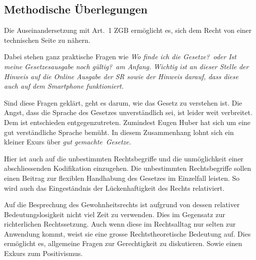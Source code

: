 \subsection{Methodische Überlegungen}
Die Auseinandersetzung mit Art.\ 1 ZGB ermöglicht es, sich dem Recht von
einer technischen Seite zu nähern.

Dabei stehen ganz praktische Fragen wie \itshape Wo finde ich die
Gesetze?\normalfont\ oder \itshape Ist meine Gesetzesausgabe noch
gültig?\normalfont\ am Anfang. Wichtig ist an dieser Stelle der Hinweis
auf die Online Ausgabe der SR sowie der Hinweis darauf, dass diese auch
auf dem Smartphone funktioniert.

Sind diese Fragen geklärt, geht es darum, wie das Gesetz zu verstehen
ist. Die Angst, dass die Sprache des Gesetzes unverständlich sei, ist
leider weit verbreitet. Dem ist entschieden entgegenzutreten. Zumindest
Eugen Huber hat sich um eine gut verständliche Sprache bemüht. In diesem
Zusammenhang lohnt sich ein kleiner Exurs über \itshape gut
gemachte\normalfont\ Gesetze.

Hier ist auch auf die unbestimmten Rechtsbegriffe und die unmöglichkeit
einer abschliessenden Kodifikation einzugehen. Die unbestimmten
Rechtsbegriffe sollen einen Beitrag zur flexiblen Handhabung des
Gesetzes im Einzelfall leisten. So wird auch das Eingeständnis der
Lückenhaftigkeit des Rechts relativiert.

Auf die Besprechung des Gewohnheitsrechts ist aufgrund von dessen
relativer Bedeutungslosigkeit nicht viel Zeit zu verwenden. Dies im
Gegensatz zur richterlichen Rechtssetzung. Auch wenn diese im
Rechtsalltag nur selten zur Anwendung kommt, weist sie eine grosse
Rechtstheoretische Bedeutung auf. Dies ermöglicht es, allgemeine Fragen
zur Gerechtigkeit zu diskutieren. Sowie einen Exkurs zum
Positivismus\autocite{kelsen}.
